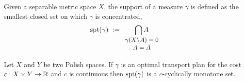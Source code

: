\begin{definition}
	Given a separable metric space $X$, the support of a measure $\gamma$ is defined as the smallest closed set on which $\gamma$ is concentrated,
	\begin{equation}
	\spt(\gamma)\ :=\underset{\small{\begin{array}{c}
			\gamma(X\backslash A)=0\\ A=\bar{A}  \end{array}}}{\bigcap A} 		
	\end{equation} 
\end{definition}
\begin{theorem}
	Let $X$ and $Y$ be two Polish spaces. If $\gamma$ is an optimal transport plan for the cost $c:X\times Y \rightarrow \mathbb{R}$ and $c$ is continuous then $\mathrm{spt}(\gamma)$ is a $c$-cyclically monotone set.
	\label{th: support in c-cyclically}
\end{theorem}
